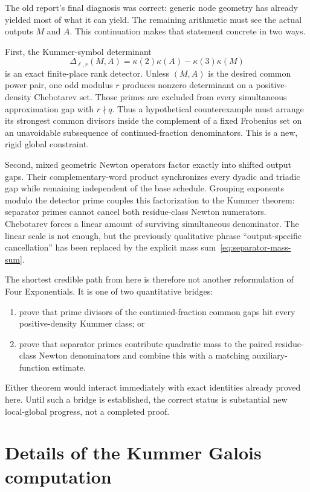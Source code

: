 \documentclass[11pt,oneside]{article}
\theoremstyle{definition}
\theoremstyle{remark}
\begin{document}
The old report's final diagnosis was correct: generic node geometry has already yielded most
of what it can yield.  The remaining arithmetic must see the actual outputs $M$ and $A$.
This continuation makes that statement concrete in two ways.

First, the Kummer-symbol determinant
\[
 \Delta_{\ell,r}(M,A)=
 \kappa(2)\kappa(A)-\kappa(3)\kappa(M)
\]
is an exact finite-place rank detector.  Unless $(M,A)$ is the desired common power pair, one
odd modulus $r$ produces nonzero determinant on a positive-density Chebotarev set.  Those
primes are excluded from every simultaneous approximation gap with $r\nmid q$.  Thus a
hypothetical counterexample must arrange its strongest common divisors inside the complement
of a fixed Frobenius set on an unavoidable subsequence of continued-fraction denominators.
This is a new, rigid global constraint.

Second, mixed geometric Newton operators factor exactly into shifted output gaps.  Their
complementary-word product synchronizes every dyadic and triadic gap while remaining
independent of the base schedule.  Grouping exponents modulo the detector prime couples this
factorization to the Kummer theorem: separator primes cannot cancel both residue-class
Newton numerators.  Chebotarev forces a linear amount of surviving simultaneous denominator.
The linear scale is not enough, but the previously qualitative phrase ``output-specific
cancellation'' has been replaced by the explicit mass sum~\eqref{eq:separator-mass-sum}.

The shortest credible path from here is therefore not another reformulation of Four
Exponentials.  It is one of two quantitative bridges:
\begin{enumerate}
\item prove that prime divisors of the continued-fraction common gaps hit every positive-density
      Kummer class; or
\item prove that separator primes contribute quadratic mass to the paired residue-class
      Newton denominators and combine this with a matching auxiliary-function estimate.
\end{enumerate}
Either theorem would interact immediately with exact identities already proved here.  Until
such a bridge is established, the correct status is substantial new local-global
progress, not a completed proof.

\appendix
\section{Details of the Kummer Galois computation}
\label{app:kummer-details}
\end{document}
